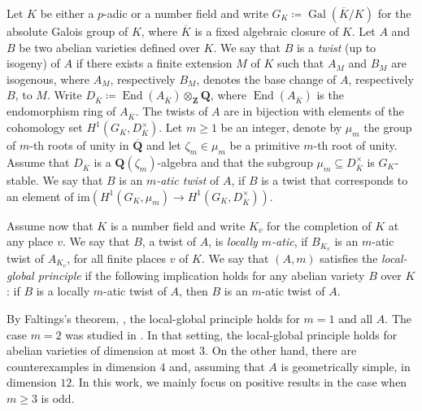 \documentclass[a4paper,10pt]{amsart}
\theoremstyle{plain}
\theoremstyle{definition}
\theoremstyle{remark}
\def\Q{\mathbf Q}
\def\Z{\mathbf Z}
\def\mr#1{\mathrm{#1}}
\def\im{\mr{im}}
\DeclareMathOperator{\Gal}{Gal}
\DeclareMathOperator{\End}{End}
\begin{document}
Let \(K\) be either a \(p\)-adic or a number field and write \(G_K \coloneqq\Gal(\overline{K}/K)\) for the absolute Galois group of \(K\), where \(\overline{K}\) is a fixed algebraic closure of \(K\). 
Let \(A\) and \(B\) be two abelian varieties defined over \(K\). We say that \(B\) is a \emph{twist} (up to isogeny) of \(A\) if there exists a finite extension \(M\) of \(K\) such that \(A_M\) and \(B_M\) are isogenous, where \(A_M\), respectively \(B_M\), denotes the base change of \(A\), respectively \(B\), to \(M\). Write \(D_{\overline K} \coloneqq \End(A_{\overline{K}}) \otimes_\Z \Q\), where 
\(\End(A_{\overline{K}})\) is the endomorphism ring of \(A_{\overline{K}}\). The twists of \(A\) are in bijection with elements of the cohomology set \(H^1(G_K, D_{\overline{K}}^\times)\). %
Let \(m \geq 1\) be an integer, denote by \(\mu_m\) the group of \(m\)-th roots of unity in \(\overline{\Q}\) and let \(\zeta_m\in\mu_m\) be a primitive \(m\)-th root of unity. Assume that \(D_{\overline{K}}\) is a \(\Q(\zeta_m)\)-algebra and that the subgroup \(\mu_m \subseteq D_{\overline{K}}^\times\) is \(G_K\)-stable. %
We say that \(B\) is an \emph{\(m\)-atic twist} of \(A\), if \(B\) is a twist that corresponds to an element of \(\im(H^1(G_K, \mu_m) \to H^1(G_K, D_{\overline{K}}^\times))\).
\par Assume now that \(K\) is a number field and write \(K_v\) for the completion of \(K\) at any place \(v\). We say that \(B\), a twist of \(A\), is \emph{locally \(m\)-atic}, if \(B_{K_v}\) is an \(m\)-atic twist of \(A_{K_v}\), for all finite places \(v\) of \(K\). We say that \((A,m)\) satisfies the \emph{local-global principle} if the following implication holds for any abelian variety \(B\) over \(K\): 
if \(B\) is a locally \(m\)-atic twist of \(A\), then \(B\) is an \(m\)-atic twist of \(A\). 
\par By Faltings's theorem, \cite{faltings}, the local-global principle holds for \(m = 1\) and all \(A\). The case \(m = 2\) was studied in \cite{ACF, fitebbasta}. In that setting, the local-global principle holds for abelian varieties of dimension at most \(3\). On the other hand, there are counterexamples in dimension \(4\) and, assuming that \(A\) is geometrically simple, in dimension \(12\).
In this work, we mainly focus on positive results in the case when \(m \geq 3\) is odd.
\end{document}
